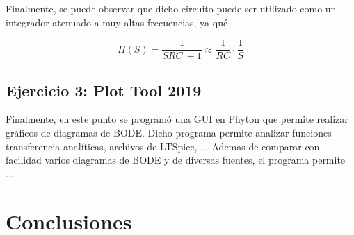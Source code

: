 \documentclass[a4paper]{article}
\begin{document}
Finalmente, se puede observar que dicho circuito puede ser utilizado como un integrador atenuado a muy altas frecuencias, ya qué

\begin{equation}
	H \left(S \right) = \frac{1}{SRC \ + 1} \approx \frac{1}{RC} \cdot \frac{1}{S}
\end{equation}

\subsection{Ejercicio 3: Plot Tool 2019}
Finalmente, en este punto se programó una GUI en Phyton que permite realizar gráficos de diagramas de BODE. Dicho programa permite analizar funciones transferencia analíticas, archivos de LTSpice, ... 
Ademas de comparar con facilidad varios diagramas de BODE y de diversas fuentes, el programa permite ...

\section{Conclusiones}
\end{document}
